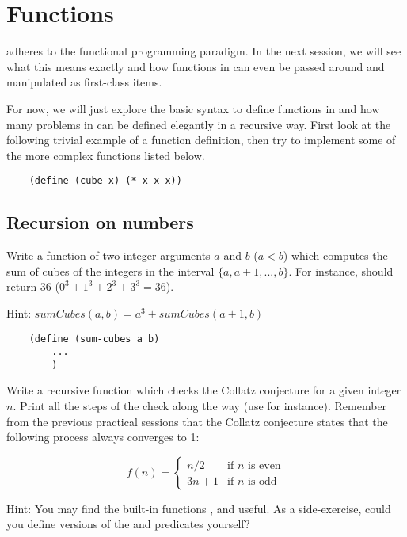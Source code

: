 \documentclass{../../../tp}
\begin{document}
\section{Functions}

\scheme adheres to the functional programming paradigm. In the next session, we will see what this means exactly and how functions in \scheme can even be passed around and manipulated as first-class items.

For now, we will just explore the basic syntax to define functions in \scheme and how many problems in \scheme can be defined elegantly in a recursive way. First look at the following trivial example of a function definition, then try to implement some of the more complex functions listed below.

\begin{verbatim}
	(define (cube x) (* x x x))
\end{verbatim}




\subsection{Recursion on numbers}



\begin{instruction}
Write a function  of two integer arguments $a$ and $b$ ($a < b$) which computes the sum of cubes of the integers in the interval $\{a, a+1, ...,  b\}$. For instance,  should return 36 ($0^3 + 1^3 + 2^3 + 3^3 = 36$).
	
	Hint: $sumCubes(a,b) = a^3 + sumCubes(a+1, b)$
	
	\begin{verbatim}
	(define (sum-cubes a b) 
		... 
		)
	\end{verbatim}
\end{instruction}



\begin{instruction}	
	
Write a recursive function  which checks the Collatz conjecture for a given integer $n$. Print all the steps of the check along the way (use  for instance). Remember from the previous practical sessions that the Collatz conjecture states that the following process always converges to 1:
	
		\begin{equation*}
		f(n) = 
		\begin{cases}
		n/2 & \text{if $n$ is even} \\
		3n + 1 & \text{if $n$ is odd} 
		\end{cases}
		\end{equation*}
	
Hint: You may find the built-in \scheme functions ,  and  useful. As a side-exercise, could you define versions of the  and  predicates yourself?
\end{instruction}
\end{document}
